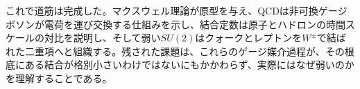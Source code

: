 \begin{classroomqa}
\end{classroomqa}

これで道筋は完成した。マクスウェル理論が原型を与え、QCDは非可換ゲージボソンが電荷を運び交換する仕組みを示し、結合定数は原子とハドロンの時間スケールの対比を説明し、そして弱い\(SU(2)\)はクォークとレプトンを\(W^\pm\)で結ばれた二重項へと組織する。残された課題は、これらのゲージ媒介過程が、その根底にある結合が格別小さいわけではないにもかかわらず、実際にはなぜ弱いのかを理解することである。